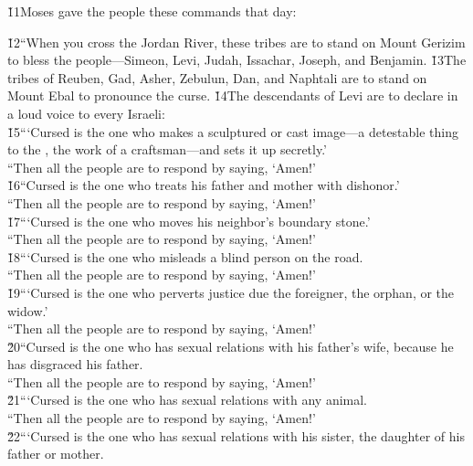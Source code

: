 \v{11}Moses gave the people these commands that day:

\begin{poetry}
\poeml \v{12}``When you cross the Jordan River, these tribes are to stand on Mount Gerizim to bless the people---Simeon, Levi, Judah, Issachar, Joseph, and Benjamin. \v{13}The tribes of Reuben, Gad, Asher, Zebulun, Dan, and Naphtali are to stand on Mount Ebal to pronounce the curse. \v{14}The descendants of Levi are to declare in a loud voice to every Israeli: \\
\poeml \v{15}```Cursed is the one who makes a sculptured or cast image---a detestable thing to the , the work of a craftsman---and sets it up secretly.' \\
\poeml ``Then all the people are to respond by saying, `Amen!' \\
\poeml \v{16}``Cursed is the one who treats his father and mother with dishonor.' \\
\poeml ``Then all the people are to respond by saying, `Amen!' \\
\poeml \v{17}```Cursed is the one who moves his neighbor's boundary stone.' \\
\poeml ``Then all the people are to respond by saying, `Amen!' \\
\poeml \v{18}```Cursed is the one who misleads a blind person on the road. \\
\poeml ``Then all the people are to respond by saying, `Amen!' \\
\poeml \v{19}```Cursed is the one who perverts justice due the foreigner, the orphan, or the widow.' \\
\poeml ``Then all the people are to respond by saying, `Amen!' \\
\poeml \v{20}``Cursed is the one who has sexual relations with his father's wife, because he has disgraced his father. \\
\poeml ``Then all the people are to respond by saying, `Amen!' \\
\poeml \v{21}```Cursed is the one who has sexual relations with any animal. \\
\poeml ``Then all the people are to respond by saying, `Amen!' \\
\poeml \v{22}```Cursed is the one who has sexual relations with his sister, the daughter of his father or mother. \\

\end{poetry}
